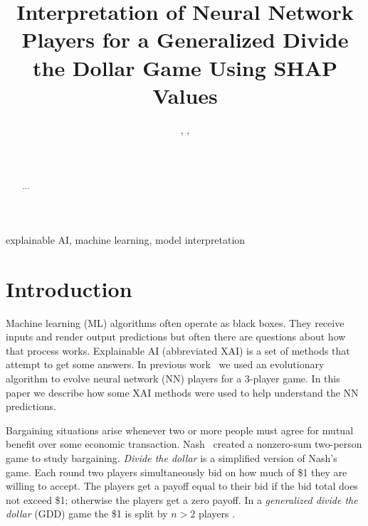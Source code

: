 \documentclass[journal]{IEEEtran} %
\begin{document}
\title{Interpretation of Neural Network Players for a Generalized Divide the Dollar Game Using SHAP Values}

\author{%
    , %
    , %
    \\%
    \\%
    \\%
}

\maketitle

\begin{abstract}
    $\cdots$
\end{abstract}

\begin{IEEEkeywords}
    explainable AI, machine learning, model interpretation
\end{IEEEkeywords}

\section{Introduction}

Machine learning (ML) algorithms often operate as black boxes. They receive inputs and render output predictions but often there are questions about how that process works. Explainable AI (abbreviated XAI) is a set of methods that attempt to get some answers.
In previous work~\cite{gree2} we used an evolutionary algorithm to evolve neural network (NN) players for a 3-player game. In this paper we describe how some XAI methods were used to help understand the NN predictions.


Bargaining situations arise whenever two or more people must agree for mutual benefit over some economic transaction. Nash~\cite{nash} created a nonzero-sum two-person game to study bargaining. \textit{Divide the dollar} is a simplified version of Nash's game. Each round two players simultaneously bid on how much of \$1 they are willing to accept. The players get a payoff equal to their bid if the bid total does not exceed \$1; otherwise the players get a zero payoff. In a \emph{generalized divide the dollar} (GDD) game the \$1 is split by $n>2$ players \cite{dan1}. 
\end{document}
